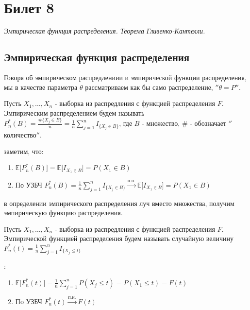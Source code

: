 \section{Билет 8}

\begin{center}
    \it
    Эмпирическая функция распределения.
    Теорема Гливенко-Кантелли.
\end{center}

\subsection{Эмпирическая функция распределения}

Говоря об эмпирическом распредлениии и эмпирической функции распределения, мы в качестве параметра $\theta$ рассматриваем как бы само распределение, $''\theta = P''$.

\begin{definition*}
    Пусть $X_1, \ldots , X_n$ - выборка из распредления с функцией распределения $F$. Эмпирическим распределением будем называть $P_{n}^{*}(B) = \frac{\#\{X_{j} \in B\}}{n} = \frac{1}{n} \sum_{j = 1}^{n} I_{\{X_j \in B\}}$, где $B$ - множество, $\#$ - обозначает $''$количество$''$.
\end{definition*}

 заметим, что:

\begin{enumerate}
    \item $\mathbb{E} \big[ P_{n}^{*}(B) \big] = \mathbb{E} \big[ I_{X_1 \in B} \big] = P(X_1 \in B)$
    \item По УЗБЧ $P_{n}^{*}(B) = \frac{1}{n} \sum_{j = 1}^{n} I_{\{X_j \in B\}} \xrightarrow{\textrm{п.н.}} \mathbb{E} \big[ I_{X_1 \in B} \big] = P(X_1 \in B)$
\end{enumerate}

 в определении эмпирического распределения луч вместо множества, получим эмпирическую функцию распределения.

\begin{definition*}
    Пусть $X_1, \ldots , X_n$ - выборка из распредления с функцией распределения $F$. Эмпирической функцией распределения будем называть случайную величину $F_{n}^{*}(t) = \frac{1}{n} \sum_{j = 1}^{n} I_{\{X_j \leq t\}}$
\end{definition*}

:

\begin{enumerate}
    \item $\mathbb{E} \big[ F_{n}^{*}(t) \big] = \frac{1}{n} \sum_{j = 1}^{n} P(X_j \leq t) = P(X_1 \leq t) = F(t)$
    \item По УЗБЧ $F_{n}^{*}(t) \xrightarrow{\textrm{п.н.}} F(t)$
\end{enumerate}

